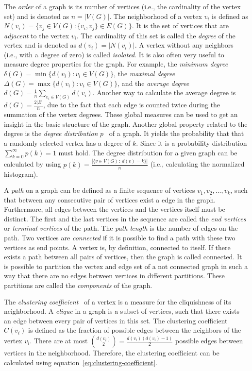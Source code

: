 The \emph{order} of a graph is its number of vertices (i.e., the cardinality of the vertex set) and is denoted as \(n = |V(G)|\).
The neighborhood of a vertex \(v_i\) is defined as \(N(v_i) = \{v_j \in V(G) : \{v_i, v_j \} \in E(G)\}\).
It is the set of vertices that are \emph{adjacent} to the vertex \(v_i\).
The cardinality of this set is called the \emph{degree} of the vertex and is denoted as \(d(v_i) = |N(v_i)|\).
A vertex without any neighbors (i.e., with a degree of zero) is called \emph{isolated}.
It is also often very useful to measure degree properties for the graph.
For example, the \emph{minimum degree} \(\delta(G) = \min\{d(v_i) : v_i \in V(G)\}\), the \emph{maximal degree} \(\Delta(G) = \max\{d(v_i) : v_i \in V(G)\}\), and the \emph{average degree} \(d(G) = \frac{1}{n} \sum_{v_i \in V(G)} d(v_i)\).
Another way to calculate the average degree is \(d(G) = \frac{2|E|}{n}\), due to the fact that each edge is counted twice during the summation of the vertex degrees.
These global measures can be used to get an insight in the basic structure of the graph.
Another global property related to the degree is the \emph{degree distribution} \(p\)~\cite{Barabasi2016} of a graph.
It yields the probability that that a randomly selected vertex has a degree of \(k\).
Since it is a probability distribution \(\sum_{k=0}^\infty p(k) = 1\) must hold.
The degree distribution for a given graph can be calculated by using \(p(k) = \frac{|\{v \in V(G) \,:\, d(v) = k\}|}{n}\) (i.e., calculating the normalized histogram).

A \emph{path} on a graph can be defined as a finite sequence of vertices \(v_1,v_2,\dots,v_k\), such that between any consecutive pair of vertices exist a edge in the graph.
Furthermore, all edges between the vertices and the vertices itself must be distinct.
The first and the last vertices in the sequence are called the \emph{end vertices} or \emph{terminal vertices} of the path.
The \emph{path length} is the number of edges on the path.
Two vertices are \emph{connected} if it is possible to find a path with these two vertices as end points.
A vertex is, by definition, connected to itself.
If there exists a path between all pairs of vertices, then the graph is called connected.
It is possible to partition the vertex and edge set of a not connected graph in such a way that there are no edges between vertices in different partitions.
These partitions are called the \emph{components} of the graph.

The \emph{clustering coefficient}~\cite{Watts1998} of a vertex is a measure for the cliquishness of its neighborhood.
A \emph{clique} in a graph is a subset of vertices, such that there exists an edge between every pair of vertices in this set.
The clustering coefficient \(C(v_i)\) is defined as the fraction of possible edges between the neighbors of the vertex \(v_i\).
There are at most \(\binom{d(v_i)}{2} = \frac{d(v_i)(d(v_i) - 1)}{2}\) possible edges between vertices in the neighborhood.
Therefore, the clustering coefficient can be calculated using equation~\ref{eq:clustering-coefficient}.

